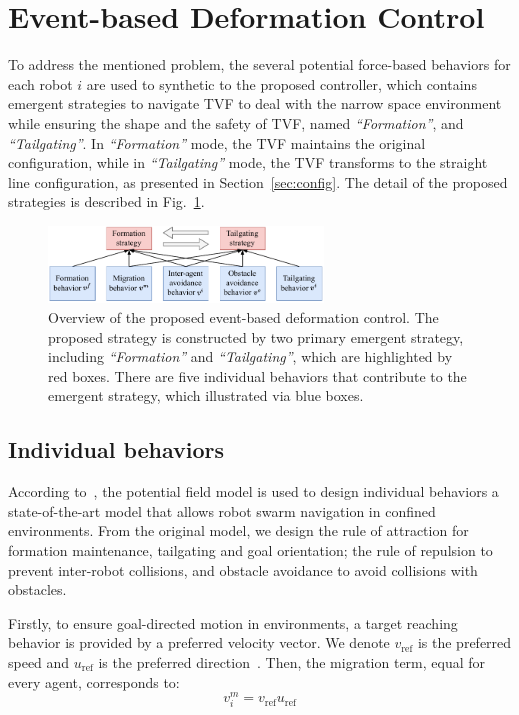 \section{Event-based Deformation Control}\label{sec3}

To address the mentioned problem, the several potential force-based behaviors for each robot $i$ are used to synthetic to the proposed controller, which contains emergent strategies to navigate TVF to deal with the narrow space environment while ensuring the shape and the safety of TVF, named \textit{``Formation''}, and \textit{``Tailgating''}. In \textit{``Formation''} mode, the TVF maintains the original configuration, while in \textit{``Tailgating''} mode, the TVF transforms to the straight line configuration, as presented in Section~\ref{sec:config}. The detail of the proposed strategies is described in Fig.~\ref{fig:1control_diagram}.

\begin{figure}
    \centering
    \includegraphics[width=0.65\textwidth]{paper2/images/control_diagram.pdf}
    \caption{Overview of the proposed event-based deformation control. The proposed strategy is constructed by two primary emergent strategy, including \textit{``Formation''} and \textit{``Tailgating''}, which are highlighted by red boxes. There are five individual behaviors that contribute to the emergent strategy, which illustrated via blue boxes.}
    \label{fig:1control_diagram}
\end{figure}

\subsection{Individual behaviors}
According to~\cite{Vsrhelyi2018}, the potential field model is used to design individual behaviors a state-of-the-art model that allows robot swarm navigation in confined environments. From the original model, we design the rule of attraction for formation maintenance, tailgating and goal orientation; the rule of repulsion to prevent inter-robot collisions, and obstacle avoidance to avoid collisions with 
obstacles. 

Firstly, to ensure goal-directed motion in environments, a target reaching behavior is provided by a preferred velocity vector. We denote $v_\text{ref}$ is the preferred speed and $u_\text{ref}$ is the preferred direction~\cite{6095129}. Then, the migration term, equal for every agent, corresponds to:
\begin{equation}
    v_i^m=v_\text{ref}u_\text{ref}
\end{equation}


